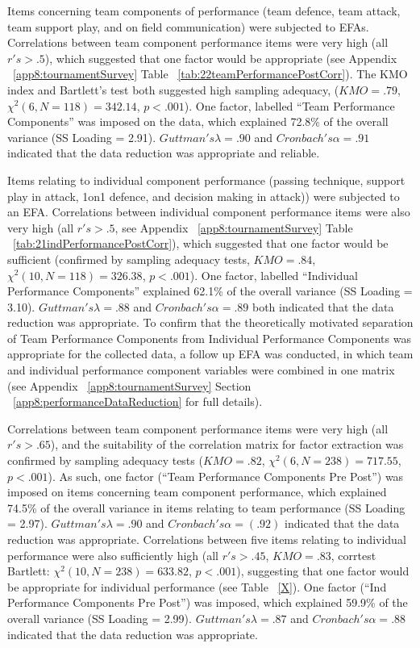 \begin{CJK}{UTF8}{gbsn}
Items concerning team components of performance (team defence, team attack, team support play, and on field communication) were subjected to EFAs.  Correlations between team component performance items were very high (all $r's > .5$), which suggested that one factor would be appropriate (see Appendix ~\ref{app8:tournamentSurvey} Table ~\ref{tab:22teamPerformancePostCorr}). The KMO index and Bartlett's test both suggested high sampling adequacy, ($KMO = .79$, $\chi^2(6, N = 118) = 342.14$, $p < .001$).  One factor, labelled ``Team Performance Components'' was imposed on the data, which explained 72.8\% of the overall variance (SS Loading = 2.91). $Guttman's \lambda =.90$ and $Cronbach's\alpha = .91$ indicated that the data reduction was appropriate and reliable.

Items relating to individual component performance (passing technique, support play in attack, 1on1 defence, and decision making in attack))  were subjected to an EFA.  Correlations between individual component performance items were also very high (all $r's > .5$, see Appendix ~\ref{app8:tournamentSurvey} Table ~\ref{tab:21indPerformancePostCorr}), which suggested that one factor would be sufficient (confirmed by sampling adequacy tests, $KMO =  .84$, $\chi^2(10, N = 118) =  326.38$, $p < .001$).  One factor, labelled ``Individual Performance Components'' explained 62.1\% of the overall variance (SS Loading = 3.10).
$Guttman's \lambda =.88$ and $Cronbach's  \alpha = .89$ both indicated that the data reduction was appropriate.  To confirm that the theoretically motivated separation of Team Performance Components from Individual Performance Components was appropriate for the collected data, a follow up EFA was conducted, in which team and individual performance component variables were combined in one matrix (see Appendix ~\ref{app8:tournamentSurvey} Section ~\ref{app8:performanceDataReduction} for full details).

Correlations between team component performance items were very high (all $r's > .65$), and the suitability of the correlation matrix for factor extraction was confirmed by sampling adequacy tests ($KMO = .82$, $\chi^2(6, N = 238) = 717.55$, $p < .001$).  As such, one factor (``Team Performance Components Pre Post'') was imposed on items concerning team component performance, which explained 74.5\% of the overall variance in items relating to team performance (SS Loading = 2.97). $Guttman's \lambda =.90$ and $Cronbach's \alpha = (.92)$ indicated that the data reduction was appropriate.  Correlations between five items relating to individual performance were also sufficiently high (all $r's > .45$, $KMO = .83$, corrtest Bartlett: $\chi^2(10, N = 238) = 633.82$, $p < .001$), suggesting that one factor would be appropriate for individual performance (see Table ~\ref{X}).  One factor (``Ind Performance Components Pre Post'') was imposed, which explained 59.9\% of the overall variance (SS Loading = 2.99).  $Guttman's\lambda =.87$ and $Cronbach's \alpha = .88$ indicated that the data reduction was appropriate.


\end{CJK}
